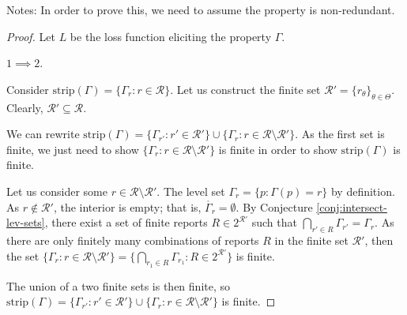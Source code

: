 \documentclass[12pt]{article}
\newcommand{\E}{\mathbb{E}}
\newcommand{\R}{\mathcal{R}}
\newcommand{\inter}[1]{\mathring{#1}}%
\newcommand{\strip}{\text{strip}}
\DeclareMathOperator*{\argmin}{arg\,min}
\begin{document}
Notes:
In order to prove this, we need to assume the property is non-redundant.


\begin{proof}
Let $L$ be the loss function eliciting the property $\Gamma$.

$1 \implies 2$. 


Consider $\strip(\Gamma) = \{\Gamma_r : r \in \R \}$.
Let us construct the finite set $\R' = \{r_\theta \}_{\theta \in \Theta}$.
Clearly, $\R' \subseteq \R$.

We can rewrite $\strip(\Gamma) = \{\Gamma_{r'} : r' \in \R' \} \cup \{\Gamma_{r} : r \in \R \setminus \R' \}$.
As the first set is finite, we just need to show $\{\Gamma_{r} : r \in \R \setminus \R' \}$ is finite in order to show $\strip(\Gamma)$ is finite.

Let us consider some $r\in\R \setminus \R'$.
The level set $\Gamma_r = \{p : \Gamma(p) = r\}$ by definition.
As $r \not\in \R'$, the interior is empty; that is, $\inter{\Gamma_r} = \emptyset$.
By Conjecture \ref{conj:intersect-lev-sets}, there exist a set of finite reports $R \in 2^{\R'}$ such that $\bigcap_{r'\in R} \Gamma_{r'} = \Gamma_r$.
As there are only finitely many combinations of reports $R$ in the finite set $\R'$, then the set $\{ \Gamma_r : r \in \R \setminus \R' \} =  \{ \bigcap_{r_1 \in R} \Gamma_{r_1} : R \in 2^{\R'} \}$ is finite.


The union of a two finite sets is then finite, so $\strip(\Gamma) = \{ \Gamma_{r'} : r' \in \R' \} \cup \{ \Gamma_r : r \in \R \setminus \R' \}$ is finite.





\end{proof}
\end{document}
